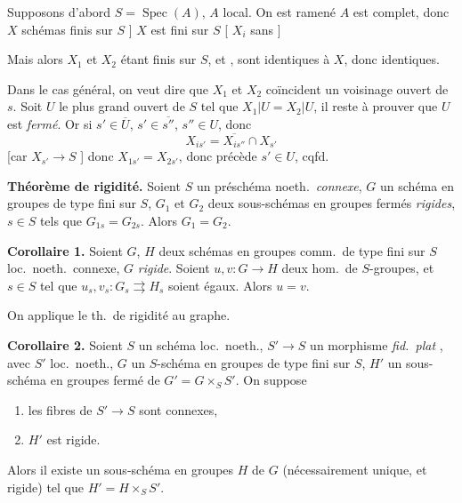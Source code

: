 \documentclass[11pt,a4paper]{article}
\begin{document}
Supposons d'abord $S = \operatorname{Spec}(A)$, $A$ \ill{} local. On est ramené
\ill{} \ill{} \ill{} $A$ est complet, donc 
 $X$ \ill{} \ill{}  
schémas \ill{} finis sur $S$ ] \ill{} \ill{} \ill{} $X$ est fini sur $S$ [\ill{} \ill{}
\ill{} $X_i$ \ill{} \ill{} \ill{} \ill{} sans \ill{}]

 Mais alors $X_1$ et
$X_2$ étant finis  sur $S$, et \ill{} \ill{}, sont identiques à
$X$, donc identiques. 

Dans le cas général, on veut dire que $X_1$ et $X_2$ coïncident \add{\ill{}}
\ill{} un voisinage ouvert \struck{\ill{}} de $s$. Soit $U$ le plus grand
ouvert \ill{} de $S$ tel que $X_1|U = X_2|U$, il reste à prouver que $U$ est
\emph{fermé}. Or si $s' \in \overline{U}$, \ill{} \ill{} $s' \in
\overline{s''}$, $s'' \in U$, donc
\[
  X_{is'} = \overline{X_{is''}} \cap X_{s'}
\]
[car $X_{s'} \to S$ \ill{} \ill{}] donc $X_{1s'} = X_{2s'}$, donc \ill{} \ill{}
\ill{} \ill{} précède $s' \in U$, cqfd.

\struck{\ill{}}

\textbf{Théorème de rigidité.} Soient $S$ un préschéma  noeth.\
\emph{connexe}, $G$ un schéma en groupes \add{\ill{}} \struck{\ill{}} de type
fini \struck{\ill{}} sur $S$, $G_1$ et $G_2$ deux sous-schémas en groupes
fermés \emph{rigides}, \uncertain{soit} $s \in S$ tels que $G_{1s} = G_{2s}$.
\struck{\ill{} \ill{} $s \in S$.} \struck{Alors} Alors $G_1 = G_2$.

\textbf{Corollaire 1.} Soient $G$, $H$ deux \struck{\ill{}} schémas en groupes
comm.\ de type fini sur $S$ loc.\ noeth.\ connexe, $G$ \emph{rigide}. Soient
$u, v \colon G \to H$ deux hom.\ de $S$-groupes, et $s \in S$ tel que
$u_s, v_s \colon G_s \rightrightarrows H_s$ soient égaux. Alors $u = v$.

On applique le th.\ de rigidité au graphe.

\textbf{Corollaire 2.} Soient $S$ un schéma loc.\ noeth.,
$S' \to S$ un morphisme \emph{fid.\ plat} 
\struck{\ill{}}, avec $S'$ loc.\ noeth., $G$ un $S$-schéma en groupes
\ill{} de type fini sur $S$, $H'$ un sous-schéma en groupes fermé de
$G' = G \times_S S'$. On suppose
\begin{enumerate}
  \item[(i)] les fibres de $S' \to S$ sont  connexes,
  \item[(ii)] $H'$ est rigide.
\end{enumerate}
Alors il existe un sous-schéma en groupes  $H$ de $G$
(nécessairement unique, et rigide) tel que $H' = H \times_S S'$.
\end{document}
